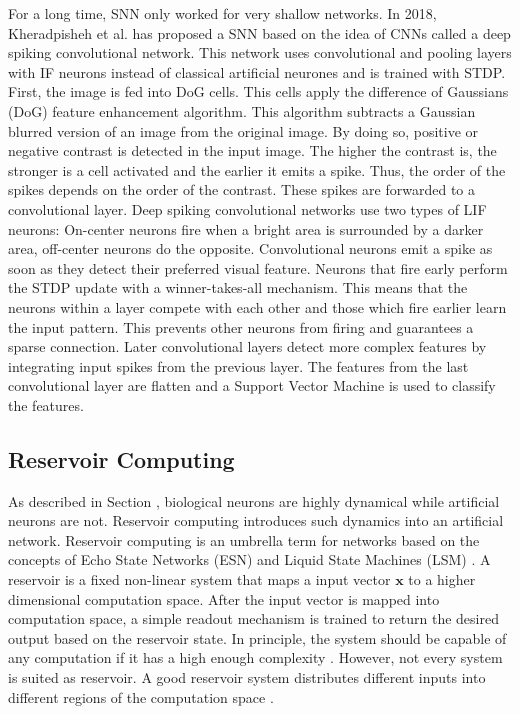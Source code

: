For a long time, SNN only worked for very shallow networks.
In 2018, Kheradpisheh et al.  has proposed a SNN based on the idea of CNNs called a deep spiking convolutional network.
This network uses convolutional and pooling layers with IF neurons instead of classical artificial neurones and is trained with STDP.
First, the image is fed into DoG cells.
This cells apply the difference of Gaussians (DoG) feature enhancement algorithm.
This algorithm subtracts a Gaussian blurred version of an image from the original image.
By doing so, positive or negative contrast is detected in the input image.
The higher the contrast is, the stronger is a cell activated and the earlier it emits a spike.
Thus, the order of the spikes depends on the order of the contrast.
These spikes are forwarded to a convolutional layer.
Deep spiking convolutional networks use two types of LIF neurons: On-center neurons fire when a bright area is surrounded by a darker area, off-center neurons do the opposite.
Convolutional neurons emit a spike as soon as they detect their preferred visual feature.
Neurons that fire early perform the STDP update with a winner-takes-all mechanism.
This means that the neurons within a layer compete with each other and those which fire earlier learn the input pattern.
This prevents other neurons from firing and guarantees a sparse connection.
Later convolutional layers detect more complex features by integrating input spikes from the previous layer.
The features from the last convolutional layer are flatten and a Support Vector Machine is used to classify the features.


\subsection{Reservoir Computing}
As described in Section , biological neurons are highly dynamical while artificial neurons are not.
Reservoir computing introduces such dynamics into an artificial network.
Reservoir computing is an umbrella term for networks based on the concepts of Echo State Networks (ESN)  and Liquid State Machines (LSM) .
A reservoir is a fixed non-linear system that maps a input vector \(\boldsymbol{x}\) to a higher dimensional computation space.
After the input vector is mapped into computation space, a simple readout mechanism is trained to return the desired output based on the reservoir state.
In principle, the system should be capable of any computation if it has a high enough complexity .
However, not every system is suited as reservoir.
A good reservoir system distributes different inputs into different regions of the computation space \cite{Konkoli_2018}.

